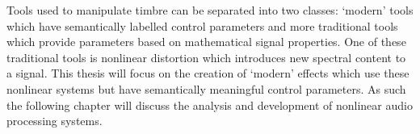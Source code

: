	Tools used to manipulate timbre can be separated into two classes: `modern' tools which have semantically labelled
	control parameters and more traditional tools which provide parameters based on mathematical signal properties. One
	of these traditional tools is nonlinear distortion which introduces new spectral content to a signal. This thesis
	will focus on the creation of `modern' effects which use these nonlinear systems but have semantically meaningful
	control parameters. As such the following chapter will discuss the analysis and development of nonlinear audio
	processing systems.
